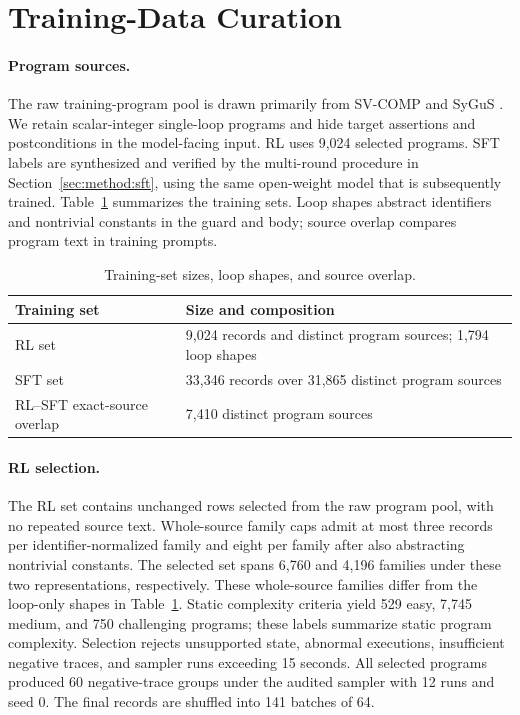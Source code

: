 \section{Training-Data Curation}
\label{app:data-curation}

\paragraph{Program sources.}
The raw training-program pool is drawn primarily from SV-COMP and SyGuS
\citep{svcomp,alur2013sygus}.  We retain scalar-integer single-loop programs
and hide target assertions and postconditions in the model-facing input.
RL uses 9,024 selected programs. SFT labels are synthesized and verified
by the multi-round procedure in Section~\ref{sec:method:sft}, using the
same open-weight model that is subsequently trained.
Table~\ref{tab:training-sets} summarizes the training sets. Loop shapes
abstract identifiers and nontrivial constants in the guard and body;
source overlap compares program text in training prompts.

\begin{table}[H]
\centering
\begin{tabular}{lp{7.2cm}}
\toprule
\rowcolor{algobg}
Training set & Size and composition \\
\midrule
RL set & 9,024 records and distinct program sources; 1,794 loop shapes \\
SFT set & 33,346 records over 31,865 distinct program sources \\
RL--SFT exact-source overlap & 7,410 distinct program sources \\
\bottomrule
\end{tabular}
\caption{Training-set sizes, loop shapes, and source overlap.}
\label{tab:training-sets}
\end{table}

\paragraph{RL selection.}
The RL set contains unchanged rows selected from the raw program pool, with
no repeated source text.  Whole-source family caps admit at most three
records per identifier-normalized family and eight per family after also
abstracting nontrivial constants.  The selected set spans 6,760 and 4,196
families under these two representations, respectively.  These whole-source
families differ from the loop-only shapes in Table~\ref{tab:training-sets}.
Static complexity criteria yield 529 easy, 7,745 medium, and 750 challenging
programs; these labels summarize static program complexity. Selection rejects unsupported state, abnormal executions,
insufficient negative traces, and sampler runs exceeding 15 seconds.  All
selected programs produced 60 negative-trace groups under the audited sampler
with 12 runs and seed 0. The final records are shuffled into 141 batches of 64.

